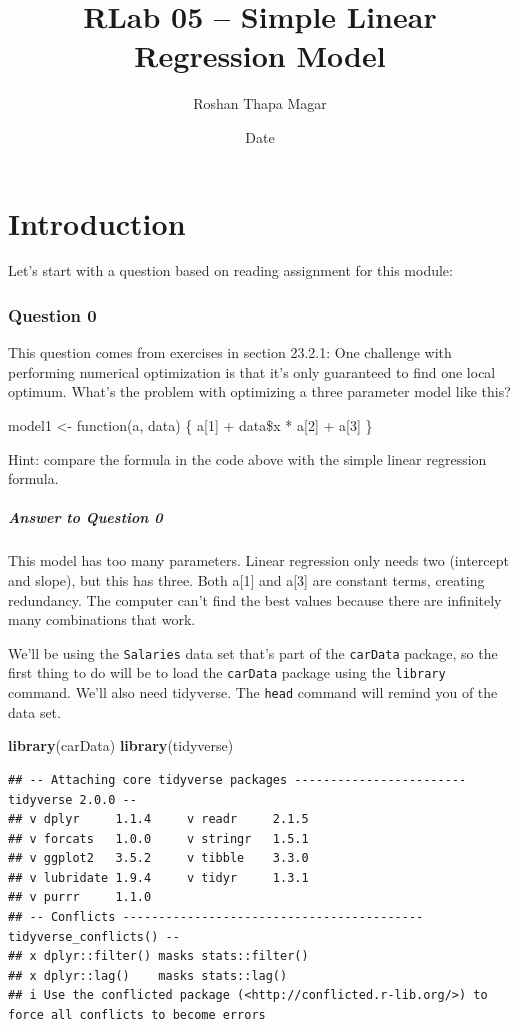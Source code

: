 \documentclass[
]{article}
\title{RLab 05 -- Simple Linear Regression Model}
\author{Roshan Thapa Magar}
\date{Date}
\newenvironment{Shaded}{\begin{snugshade}}{\end{snugshade}}
\newcommand{\FunctionTok}[1]{\textcolor[rgb]{0.13,0.29,0.53}{\textbf{#1}}}
\newcommand{\NormalTok}[1]{#1}
\begin{document}
\maketitle

\hypertarget{introduction}{%
\section{Introduction}\label{introduction}}

Let's start with a question based on reading assignment for this module:

\hypertarget{question-0}{%
\subsubsection{Question 0}\label{question-0}}

This question comes from exercises in section 23.2.1: One challenge with
performing numerical optimization is that it's only guaranteed to find
one local optimum. What's the problem with optimizing a three parameter
model like this?

model1 \textless- function(a, data) \{ a{[}1{]} + data\$x * a{[}2{]} +
a{[}3{]} \}

Hint: compare the formula in the code above with the simple linear
regression formula.

\hypertarget{answer-to-question-0}{%
\subparagraph{Answer to Question 0}\label{answer-to-question-0}}

This model has too many parameters. Linear regression only needs two
(intercept and slope), but this has three. Both a{[}1{]} and a{[}3{]}
are constant terms, creating redundancy. The computer can't find the
best values because there are infinitely many combinations that work.

We'll be using the \texttt{Salaries} data set that's part of the
\texttt{carData} package, so the first thing to do will be to load the
\texttt{carData} package using the \texttt{library} command. We'll also
need tidyverse. The \texttt{head} command will remind you of the data
set.

\begin{Shaded}
\begin{Highlighting}[]
\FunctionTok{library}\NormalTok{(carData)}
\FunctionTok{library}\NormalTok{(tidyverse)}
\end{Highlighting}
\end{Shaded}

\begin{verbatim}
## -- Attaching core tidyverse packages ------------------------ tidyverse 2.0.0 --
## v dplyr     1.1.4     v readr     2.1.5
## v forcats   1.0.0     v stringr   1.5.1
## v ggplot2   3.5.2     v tibble    3.3.0
## v lubridate 1.9.4     v tidyr     1.3.1
## v purrr     1.1.0     
## -- Conflicts ------------------------------------------ tidyverse_conflicts() --
## x dplyr::filter() masks stats::filter()
## x dplyr::lag()    masks stats::lag()
## i Use the conflicted package (<http://conflicted.r-lib.org/>) to force all conflicts to become errors
\end{verbatim}
\end{document}
